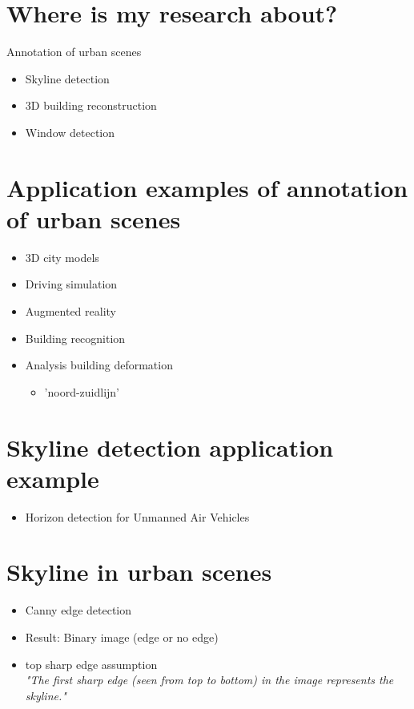 \section{Where is my research about?}
\item{Annotation of urban scenes}
	\begin{itemize}
		\item Skyline detection
		\item 3D building reconstruction
		\item Window detection
	\end{itemize}

\section{Application examples of annotation of urban scenes}
\begin{itemize}
	\item 3D city models
	\item Driving simulation
	\item Augmented reality
	\item Building recognition
	\item Analysis building deformation
	\begin{itemize}
		\item 	'noord-zuidlijn'
	\end{itemize}
\end{itemize}


\section{Skyline detection application example}
\begin{itemize}
	\item Horizon detection for Unmanned Air Vehicles
\end{itemize}

\section{Skyline in urban scenes}%
\begin{itemize}
	\item Canny edge detection 
	\item Result: Binary image (edge or no edge)
	\item top sharp edge assumption\\
	\emph{"The first sharp edge (seen from top to bottom) in the image represents the skyline."}
\end{itemize}



